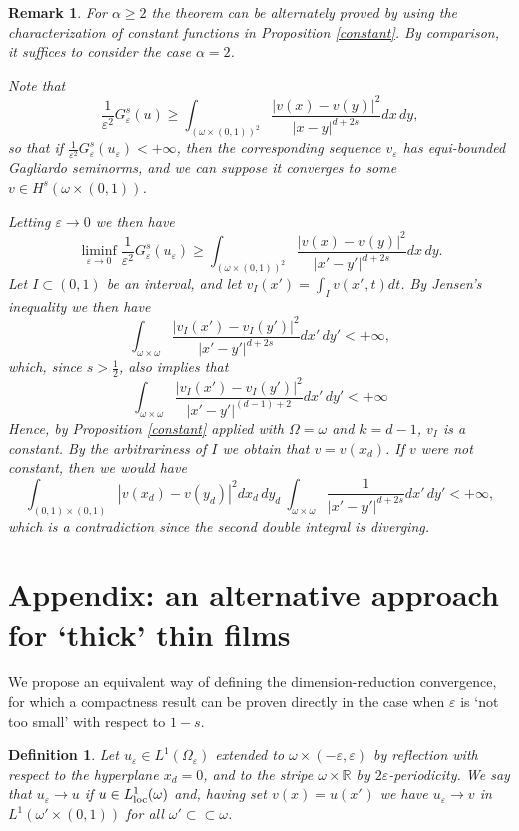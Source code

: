 \documentclass{article}
\newtheorem{remark}[lemma]{Remark}
\newtheorem{definition}[lemma]{Definition}
\newcommand{\e}{\varepsilon}
\begin{document}
\begin{remark}\rm
For $\alpha\ge 2$ the theorem can be alternately proved by using the characterization of constant functions in Proposition \ref{constant}.  By comparison, it suffices to consider the case $\alpha=2$.

Note that
$$
\frac1{\e^2}G^s_\e(u)\ge \int_{(\omega\times (0,1))^2} \frac{|v(x)-v(y)|^2}{|x-y|^{d+2s}} dx\,dy,
$$
so that if $\frac1{\e^2}G^s_\e(u_\e)<+\infty$, then the corresponding sequence $v_\e$ has equi-bounded Gagliardo seminorms, and we can suppose it converges to some $v\in H^s(\omega\times (0,1))$. 

Letting $\e\to 0$ we then have 
$$
\liminf_{\e\to0} \frac1{\e^2}G^s_\e(u_\e)\ge \int_{(\omega\times (0,1))^2} \frac{|v(x)-v(y)|^2}{|x'-y'|^{d+2s}} dx\,dy.
$$
Let $I\subset (0,1)$ be an interval, and let $v_I(x')=\int_I v(x',t)dt$. By Jensen's inequality we then have 
$$
\int_{\omega\times\omega} \frac{|v_I(x')-v_I(y')|^2}{|x'-y'|^{d+2s}} dx'\,dy'<+\infty,
$$
which, since $s>\frac12$, also implies that
$$
\int_{\omega\times\omega} \frac{|v_I(x')-v_I(y')|^2}{|x'-y'|^{(d-1)+2}} dx'\,dy'<+\infty
$$
Hence, by Proposition \ref{constant} applied with $\Omega=\omega$ and $k=d-1$, $v_I$ is a constant. By the arbitrariness of $I$ we obtain that $v=v(x_d)$. If $v$ were not constant, then we would have
$$
\int_{(0,1)\times(0,1)}|v(x_d)-v(y_d)|^2dx_d\,dy_d\ \int_{\omega\times\omega}\frac{1}{|x'-y'|^{d+2s}} dx'\,dy'<+\infty,
$$
which is a contradiction since the second double integral is diverging.\end{remark}







\section*{Appendix: an alternative approach for `thick' thin films}
We propose an equivalent way of defining the dimension-reduction convergence, for which a compactness result can be proven directly in the case when $\e$ is `not too small' with respect to $1-s$.

\begin{definition} Let $u_\e\in L^1(\Omega_\e)$ extended to $\omega\times(-\e,\e)$ by reflection with respect to the hyperplane $x_d=0$, and to the stripe $\omega\times \mathbb R$ by $2\e$-periodicity. We say that $u_\e\to u$ if $u\in L^1_{\rm loc}(\omega)$ and, having set $v(x)=u(x')$ we have $u_\e\to v$ in $L^1(\omega'\times (0,1))$ for all $\omega'\subset\!\subset\omega$.
\end{definition}
\end{document}
